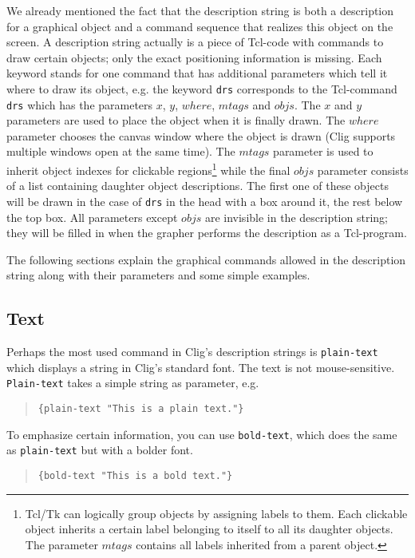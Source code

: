 We already mentioned the fact that the description string is both a
description for a graphical object and a command sequence that realizes
this object on the screen. A description string actually is a piece of
Tcl-code with commands to draw certain objects; only the exact
positioning information is missing. Each keyword stands for one command
that has additional parameters which tell it where to draw its object,
e.g. the keyword {\tt drs} corresponds to the Tcl-command {\tt drs}
which has the parameters $x$, $y$, $where$, $mtags$ and $objs$. The $x$
and $y$ parameters are used to place the object when it is finally
drawn. The $where$ parameter chooses the canvas window where the object
is drawn ({\sc Clig} supports multiple windows open at the same
time). The $mtags$ parameter is used to inherit object indexes for
clickable regions\footnote{Tcl/Tk can logically group objects by
assigning labels to them. Each clickable object inherits a certain
label belonging to itself to all its daughter objects. The parameter
$mtags$ contains all labels inherited from a parent object.} while the
final $objs$ parameter consists of a list containing daughter object
descriptions.  The first one of these objects will be drawn in the case
of {\tt drs} in the head with a box around it, the rest below the top
box. All parameters except $objs$ are invisible in the description
string; they will be filled in when the grapher performs the
description as a Tcl-program.

The following sections explain the graphical commands allowed in the
description string along with their parameters and some simple
examples.

\subsection{Text}

Perhaps the most used command in {\sc Clig}'s description strings is
{\tt plain-text} which displays a string in {\sc Clig}'s standard
font. The text is not mouse-sensitive. {\tt Plain-text} takes a simple
string as parameter, e.g.

\begin{quote}
\verb'{plain-text "This is a plain text."}'
\end{quote}

To emphasize certain information, you can use {\tt bold-text}, which
does the same as {\tt plain-text} but with a bolder font.

\begin{quote}
\verb'{bold-text "This is a bold text."}'
\end{quote}

